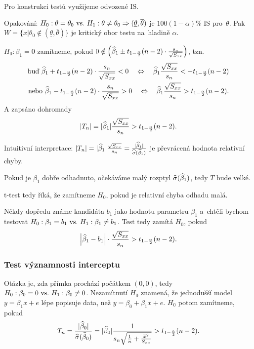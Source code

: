 Pro konstrukci testů využijeme odvozené IS.

\begin{remark}
	Opakování: $H_0: \theta = \theta_0 ~\text{vs.}~ H_1: \theta \neq \theta_0 \Rightarrow (\underline{\theta}, \overline{\theta})$ je $100(1-\alpha)\%$ IS pro~$\theta$. Pak $W = \{ x | \theta_0 \notin (\underline{\theta}, \overline{\theta}) \}$ je kritický obor testu na~hladině $\alpha$.
\end{remark}

 $H_0: \beta_1 = 0$ zamítneme, pokud $0 \notin \left(\widehat{\beta}_1 \pm t_{1-\frac{\alpha}{2}}(n-2) \cdot  \frac{s_n}{\sqrt{S_{xx}}} \right)$, tzn.
\begin{align*}
	\text{buď } \widehat{\beta}_1 + t_{1-\frac{\alpha}{2}}(n-2) \cdot  \frac{s_n}{\sqrt{S_{xx}}} < 0 \quad\Leftrightarrow\quad \widehat{\beta}_1 \frac{\sqrt{S_{xx}}}{s_n} < - t_{1-\frac{\alpha}{2}}(n-2) \\
	\text{nebo } \widehat{\beta}_1 - t_{1-\frac{\alpha}{2}}(n-2) \cdot  \frac{s_n}{\sqrt{S_{xx}}} > 0 \quad\Leftrightarrow\quad \widehat{\beta}_1 \frac{\sqrt{S_{xx}}}{s_n} > t_{1-\frac{\alpha}{2}}(n-2).
\end{align*}
A zapsáno dohromady
 $$
	|T_n| = |\widehat{\beta}_1| \frac{\sqrt{S_{xx}}}{s_n} > t_{1-\frac{\alpha}{2}}(n-2).
 $$

\begin{remark}
	Intuitivní interpretace: $|T_n| = |\widehat{\beta}_1| \frac{\sqrt{S_{xx}}}{s_n} = \frac{|\widehat{\beta}_1|}{\widehat{\sigma}(\widehat{\beta}_1)}$ je převrácená hodnota relativní chyby.
	
	Pokud je $\beta_1$ dobře odhadnuto, očekáváme malý rozptyl $\widehat{\sigma}(\widehat{\beta}_1)$, tedy $T$ bude velké.
	
	t-test tedy říká, že zamítneme $H_0$, pokud je relativní chyba odhadu malá.
\end{remark}%
\begin{remark}
	Někdy dopředu známe kandidáta $b_1$ jako hodnotu parametru $\beta_1$ a~chtěli bychom testovat
	 $H_0: \beta_1 = b_1 ~\text{vs.}~ H_1: \beta_1\neq b_1$. Test tedy zamítá $H_0$, pokud
	 $$ \left|\widehat{\beta}_1-b_1\right|\cdot \frac{\sqrt{S_{xx}}}{s_n}> t_{1-\frac{\alpha}{2}}(n-2). $$
\end{remark}
\subsubsection*{Test významnosti interceptu}
Otázka je, zda přímka prochází počátkem $(0,0)$, tedy $H_0: \beta_0 = 0 ~\text{vs.}~ H_1: \beta_0\neq0$. Nezamítnutí $H_0$ znamená, že jednodušší model $y = \beta_1 x+e$ lépe popisuje data, než $y = \beta_0+\beta_1 x+e$. $H_0$ potom zamítneme, pokud
 $$ T_n = \frac{|\widehat{\beta}_0|}{\widehat{\sigma}(\widehat{\beta}_0)} = |\widehat{\beta}_0|\frac{1}{s_n\sqrt{\frac{1}{n}+\frac{\overline{x}^2}{S_{xx}}}}>t_{1-\frac{\alpha}{2}}(n-2). $$

